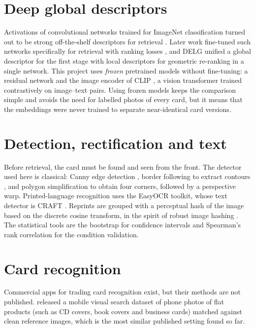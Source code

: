 \section{Deep global descriptors}

Activations of convolutional networks trained for ImageNet classification \citep{deng2009imagenet} turned out to be strong off-the-shelf descriptors for retrieval \citep{razavian2014cnnfeatures, babenko2014neuralcodes}. Later work fine-tuned such networks specifically for retrieval with ranking losses \citep{gordo2016deepretrieval, radenovic2019finetuning}, and DELG \citep{cao2020delg} unified a global descriptor for the first stage with local descriptors for geometric re-ranking in a single network. This project uses \emph{frozen} pretrained models without fine-tuning: a residual network \citep{he2016resnet} and the image encoder of CLIP \citep{radford2021clip}, a vision transformer \citep{dosovitskiy2021vit} trained contrastively on image--text pairs. Using frozen models keeps the comparison simple and avoids the need for labelled photos of every card, but it means that the embeddings were never trained to separate near-identical card versions.

\section{Detection, rectification and text}

Before retrieval, the card must be found and seen from the front. The detector used here is classical: Canny edge detection \citep{canny1986edge}, border following to extract contours \citep{suzuki1985contours}, and polygon simplification \citep{douglas1973peucker} to obtain four corners, followed by a perspective warp. Printed-language recognition uses the EasyOCR toolkit, whose text detector is CRAFT \citep{baek2019craft}. Reprints are grouped with a perceptual hash of the image based on the discrete cosine transform, in the spirit of robust image hashing \citep{venkatesan2000hashing}. The statistical tools are the bootstrap \citep{efron1979bootstrap} for confidence intervals and Spearman's rank correlation \citep{spearman1904} for the condition validation.

\section{Card recognition}

Commercial apps for trading card recognition exist, but their methods are not published. \citet{chandrasekhar2011smvs} released a mobile visual search dataset of phone photos of flat products (such as CD covers, book covers and business cards) matched against clean reference images, which is the most similar published setting found so far. 
